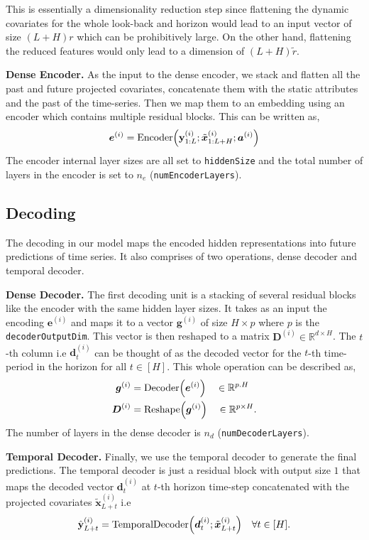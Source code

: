 \documentclass[10pt]{article} \usepackage[accepted]{tmlr}
\theoremstyle{plain}
\theoremstyle{definition}
\theoremstyle{remark}
\newcommand{\reals}{\mathbb{R}}
\newcommand{\ab}{{\bm{a}}}
\newcommand{\db}{{\bm{d}}}
\newcommand{\eb}{{\bm{e}}}
\newcommand{\gb}{{\bm{g}}}
\newcommand{\xb}{{\bm{x}}}
\newcommand{\ba}{\ab}
\newcommand{\bd}{\db}
\newcommand{\be}{\eb}
\newcommand{\bg}{\gb}
\newcommand{\bx}{\xb}
\newcommand{\bD}{\bm{{D}}}
\let\originalleft\left
\let\originalright\right
\renewcommand{\left}{\mathopen{}\mathclose\bgroup\originalleft}
\renewcommand{\right}{\aftergroup\egroup\originalright}
\def\*#1{\mathbf{#1}}
\begin{document}
This is essentially a dimensionality reduction step since flattening the dynamic covariates for the whole look-back and horizon would lead to an input vector of size $(L + H)r$ which can be prohibitively large. On the other hand, flattening the reduced features would only lead to a dimension of $(L + H)\tilde{r}$.

{\bf Dense Encoder.}  As the input to the dense encoder, we stack and flatten all the past and  future projected covariates, concatenate them with the static attributes and the past of the time-series. Then we map them to an embedding using an encoder which contains multiple residual blocks. This can be written as,
\begin{align}
    \be^{(i)} = \mathrm{Encoder} \left(\*y^{(i)}_{1:L}; \tilde{\bx}^{(i)}_{1:L+H}; \ba^{(i)} \right)
\end{align}
The encoder internal layer sizes are all set to \texttt{hiddenSize} and the total number of layers in the encoder is set to $n_e$ (\texttt{numEncoderLayers}).

\subsection{Decoding}
\label{sec:dec}
The decoding in our model maps the encoded hidden representations into future predictions of time series. It also comprises of two operations, dense decoder and temporal decoder.

{\bf Dense Decoder.} The first decoding unit is a stacking of several residual blocks like the encoder with the same hidden layer sizes. It takes as an input the encoding $\be^{(i)}$ and maps it to a vector $\bg^{(i)}$ of size $H \times p$ where $p$ is the \texttt{decoderOutputDim}. This vector is then reshaped to a matrix $\bD^{(i)} \in \reals^{d \times H}$. The $t$-th column i.e $\bd^{(i)}_t$ can be thought of as the decoded vector for the $t$-th time-period in the horizon for all $t \in [H]$. This whole operation can be described as,
\begin{align*}
    \bg^{(i)} &= \mathrm{Decoder} \left( \be^{(i)} \right)~~~\in \reals^{p.H} \\
    \bD^{(i)} &= \mathrm{Reshape} \left( \bg^{(i)} \right)~~~\in \reals^{p \times H}.
\end{align*}
The number of layers in the dense decoder is $n_d$ (\texttt{numDecoderLayers}).

{\bf Temporal Decoder.} Finally, we use the temporal decoder to generate the final predictions. The temporal decoder is just a residual block with output size $1$ that maps the decoded vector $\bd^{(i)}_t$ at $t$-th horizon time-step concatenated with the projected covariates $\tilde{\bx}^{(i)}_{L+t}$ i.e
\begin{align*}
    \hat{\*y}^{(i)}_{L+t} = \mathrm{TemporalDecoder} \left( \bd^{(i)}_t; \tilde{\bx}^{(i)}_{L+t}\right)~~~\forall t \in [H].
\end{align*}
\end{document}
